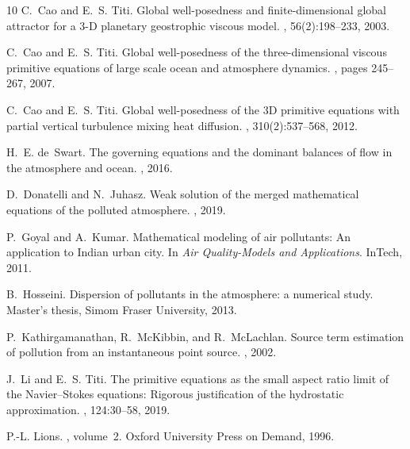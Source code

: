 \documentclass[11pt]{article}
\begin{document}
\begin{thebibliography}{10}
C.~Cao and E.~S. Titi.
\newblock Global well-posedness and finite-dimensional global attractor for a 3-D planetary geostrophic viscous model.
, 56(2):198--233, 2003.

C.~Cao and E.~S. Titi.
\newblock Global well-posedness of the three-dimensional viscous primitive equations of large scale ocean and atmosphere dynamics.
, pages 245--267, 2007.

C.~Cao and E.~S. Titi.
\newblock Global well-posedness of the 3D primitive equations with partial vertical turbulence mixing heat diffusion.
, 310(2):537--568, 2012.

H.~E. de~Swart.
\newblock The governing equations and the dominant balances of flow in the atmosphere and ocean.
, 2016.

D.~Donatelli and N.~Juhasz.
\newblock Weak solution of the merged mathematical equations of the polluted atmosphere.
, 2019.

P.~Goyal and A.~Kumar.
\newblock Mathematical modeling of air pollutants: An application to Indian urban city.
\newblock In {\em Air Quality-Models and Applications}. InTech, 2011.

B.~Hosseini.
\newblock Dispersion of pollutants in the atmosphere: a numerical study.
\newblock Master's thesis, Simom Fraser University, 2013.

P.~Kathirgamanathan, R.~McKibbin, and R.~McLachlan.
\newblock Source term estimation of pollution from an instantaneous point source.
, 2002.

J.~Li and E.~S. Titi.
\newblock The primitive equations as the small aspect ratio limit of the Navier--Stokes equations: Rigorous justification of the hydrostatic approximation.
, 124:30--58, 2019.

P.-L. Lions.
, volume~2.
\newblock Oxford University Press on Demand, 1996.


\end{thebibliography}
\end{document}
